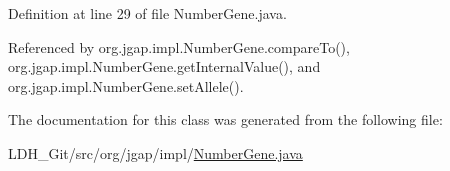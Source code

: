 Definition at line 29 of file Number\-Gene.\-java.



Referenced by org.\-jgap.\-impl.\-Number\-Gene.\-compare\-To(), org.\-jgap.\-impl.\-Number\-Gene.\-get\-Internal\-Value(), and org.\-jgap.\-impl.\-Number\-Gene.\-set\-Allele().



The documentation for this class was generated from the following file\-:\begin{DoxyCompactItemize}
\item 
L\-D\-H\-\_\-\-Git/src/org/jgap/impl/\hyperlink{_number_gene_8java}{Number\-Gene.\-java}\end{DoxyCompactItemize}
